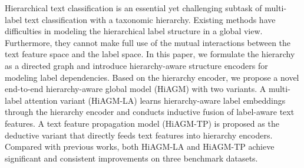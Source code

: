 Hierarchical text classification is an essential yet challenging subtask of multi-label text classification with a taxonomic hierarchy. Existing methods have difficulties in modeling the hierarchical label structure in a global view. Furthermore, they cannot make full use of the mutual interactions between the text feature space and the label space. In this paper, we formulate the hierarchy as a directed graph and introduce hierarchy-aware structure encoders for modeling label dependencies. Based on the hierarchy encoder, we propose a novel end-to-end hierarchy-aware global model (HiAGM) with two variants. A multi-label attention variant (HiAGM-LA) learns hierarchy-aware label embeddings through the hierarchy encoder and conducts inductive fusion of label-aware text features. A text feature propagation model (HiAGM-TP) is proposed as the deductive variant that directly feeds text features into hierarchy encoders. Compared with previous works, both HiAGM-LA and HiAGM-TP achieve significant and consistent improvements on three benchmark datasets.
